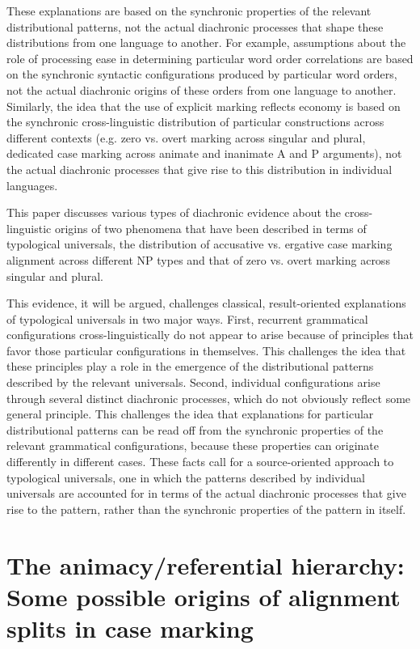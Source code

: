 \documentclass[output=paper]{langsci/langscibook}
\begin{document}
These explanations are based on the synchronic properties of the
relevant distributional patterns, not the actual diachronic processes
that shape these distributions from one language to another. For
example, assumptions about the role of processing ease in determining particular word order correlations are based on the synchronic syntactic configurations   produced by particular word orders, not the actual diachronic origins of these orders from one language to another. Similarly, the idea that the use of explicit marking reflects economy is based on the synchronic cross-linguistic distribution of particular
constructions across different contexts (e.g. zero vs. overt marking
across singular and plural, dedicated case marking across animate and
inanimate A and P arguments), not the actual diachronic processes that give rise to this distribution in individual languages. 

This paper discusses various types of diachronic evidence about the
cross-linguistic origins of two phenomena that have been described in
terms of typological universals, the distribution of accusative vs.
ergative case marking alignment across different NP types and that of
zero vs. overt marking across singular and plural. 

This evidence, it will be argued, challenges classical, result-oriented explanations of typological universals in two major ways.  First, recurrent grammatical configurations cross-linguistically do not appear to arise because of principles that favor those particular configurations in themselves. This challenges the idea that these principles play a
role in the emergence of the distributional patterns described by the
relevant universals.  
Second, individual configurations arise through several distinct
  diachronic processes, which do not obviously reflect some
  general principle. This challenges the idea that explanations for
  particular distributional patterns can be read off from the
  synchronic properties of the relevant grammatical configurations,
  because these properties can originate differently in different
  cases. 
These facts call for a source-oriented approach to typological universals, one in which the patterns described by individual universals are accounted for in terms of the actual diachronic processes that give rise to the pattern, rather than the synchronic properties of the  pattern in itself.

\section{The animacy/referential hierarchy: Some possible origins of
  alignment splits in case marking}\label{alignment}
\end{document}
